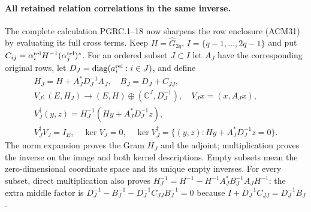 \paragraph{All retained relation correlations in the same inverse.}
The complete calculation PGRC.1--18 now sharpens the row enclosure
(ACM31) by evaluating its full cross terms. Keep
$H=\widehat G_{2q}$, $I=\{q-1,\ldots,2q-1\}$ and put
$C_{ij}=\alpha_i^{\rm rel}H^{-1}(\alpha_j^{\rm rel})^*$.
For an ordered subset $J\subset I$ let $A_J$ have the corresponding
original rows, let $D_J=\operatorname{diag}(a_i^{\rm rel}:i\in J)$,
and define
\[
\begin{gathered}
 H_J=H+A_J^*D_J^{-1}A_J,\quad B_J=D_J+C_{JJ},\\
 V_J:(E,H_J)\longrightarrow(E,H)\oplus(\mathbb C^J,D_J^{-1}),
 \quad V_Jx=(x,A_Jx),\\
 V_J^\dagger(y,z)=H_J^{-1}(Hy+A_J^*D_J^{-1}z),\\
 V_J^\dagger V_J=I_E,\quad\ker V_J=0,\quad
 \ker V_J^\dagger=\{(y,z):Hy+A_J^*D_J^{-1}z=0\}.
\end{gathered}\tag{ACM32}
\]
The norm expansion proves the Gram $H_J$ and the adjoint;
multiplication proves the inverse on the image and both kernel
descriptions. Empty subsets mean the zero-dimensional coordinate
space and its unique empty inverses. For every subset, direct
multiplication also proves
$H_J^{-1}=H^{-1}-H^{-1}A_J^*B_J^{-1}A_JH^{-1}$:
the extra middle factor is
$D_J^{-1}-B_J^{-1}-D_J^{-1}C_{JJ}B_J^{-1}=0$
because $I+D_J^{-1}C_{JJ}=D_J^{-1}B_J$.

